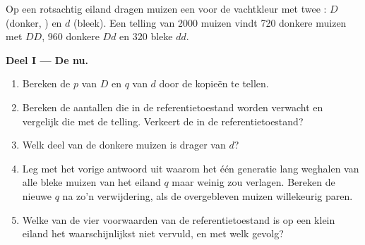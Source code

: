 \begin{problem}
\label{pb:g12:selection-drift-speciation:1}
Op een rotsachtig eiland dragen muizen een  voor de vachtkleur met twee
: $D$ (donker, ) en $d$ (bleek). Een telling van 2000
muizen vindt 720 donkere muizen met  $DD$, 960 donkere $Dd$ en
320 bleke $dd$.

\medskip
\noindent\textbf{Deel I --- De  nu.}
\begin{enumerate}
  \item Bereken de  $p$ van $D$ en $q$ van $d$ door de kopieën
        te tellen.
  \item Bereken de aantallen  die in de referentietoestand
        worden verwacht en vergelijk die met de telling. Verkeert de
         in de referentietoestand?
  \item Welk deel van de donkere muizen is drager van $d$?
  \item Leg met het vorige antwoord uit waarom het één generatie lang
        weghalen van alle bleke muizen van het eiland $q$ maar weinig zou
        verlagen. Bereken de nieuwe $q$ na zo'n verwijdering, als de
        overgebleven muizen willekeurig paren.
  \item Welke van de vier voorwaarden van de referentietoestand is op een
        klein eiland het waarschijnlijkst niet vervuld, en met welk
        gevolg?
\end{enumerate}


\end{problem}
